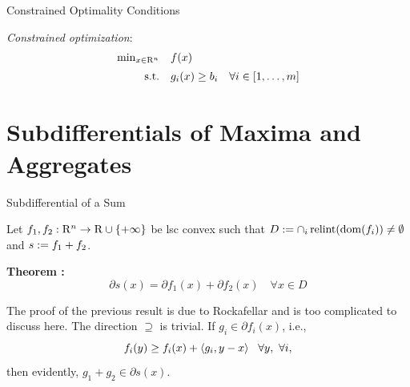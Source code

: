 \documentclass[9pt]{beamer}
\begin{document}
\begin{frame}{Constrained Optimality Conditions}

  \emph{Constrained optimization}: \quad
  \[
    \begin{array}{rl}
      \min_{x\in\mathrm{R}^n} & f(x) \\[0.5em]
      \mathrm{s.t.} & g_i(x) \geq b_i \quad \forall i\in [1,\dots, m]
    \end{array}
  \]

  \vfill

\end{frame}

\section{Subdifferentials of Maxima and Aggregates}

\begin{frame}{Subdifferential of a Sum}

  Let $f_1, f_2:\mathrm{R}^n\to\mathrm{R}\cup\{+\infty\}$ be lsc convex such that $D := \cap_{i} \operatorname{relint}(\operatorname{dom}(f_i))\neq \emptyset$ and $s:= f_1+f_2$.

  \vfill
  \textbf{Theorem :}
  \[
    \partial s(x) = \partial f_1(x) + \partial f_2(x) \quad \forall x \in D
  \]

  The proof of the previous result is due to Rockafellar and is too complicated to discuss here. The direction $\supseteq$ is trivial. If $g_i\in \partial f_i(x)$, i.e.,
  \[
    f_i(y) \geq f_i(x) + \left<g_i, y-x\right> ~~\forall y, ~\forall i,
  \]
  then evidently, $g_1+g_2\in\partial s(x)$.

  
\end{frame}
\end{document}
